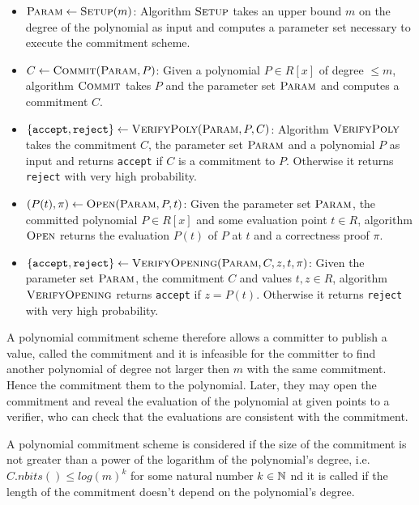 \begin{itemize}
\item $\textsc{Param}\leftarrow \textsc{Setup}(m)$: Algorithm $\textsc{Setup}$ takes an upper bound $m$ on the degree of the polynomial as input and computes a parameter set necessary to execute the commitment scheme.
\item $C\leftarrow \textsc{Commit}(\textsc{Param},P)$: Given a polynomial $P\in R[x]$ of degree $\leq m$, algorithm $\textsc{Commit}$ takes $P$ and the parameter set $\textsc{Param}$ and computes a commitment $C$.
\item $\{\mathtt{accept},\mathtt{reject}\}\leftarrow \textsc{VerifyPoly}(\textsc{Param},P,C)$: Algorithm $\textsc{VerifyPoly}$ takes the commitment $C$, the parameter set $\textsc{Param}$ and a polynomial $P$ as input and returns \texttt{accept} if $C$ is a commitment to $P$. Otherwise it returns \texttt{reject} with very high probability.
\item $(P(t),\pi)\leftarrow \textsc{Open}(\textsc{Param},P,t)$: Given the parameter set $\textsc{Param}$, the committed polynomial $P\in R[x]$ and some evaluation point $t\in R$, algorithm $\textsc{Open}$ returns the evaluation $P(t)$ of $P$ at $t$ and a correctness proof $\pi$.
\item $\{\mathtt{accept},\mathtt{reject}\}\leftarrow \textsc{VerifyOpening}(\textsc{Param},C,z,t,\pi)$: Given the parameter set $\textsc{Param}$, the commitment $C$ and values $t,z\in R$, algorithm $\textsc{VerifyOpening}$ returns \texttt{accept} if $z=P(t)$. Otherwise it returns \texttt{reject} with very high probability.
\end{itemize}

A polynomial commitment scheme therefore allows a committer to publish a value, called the commitment and it is infeasible for the committer to find another polynomial of degree not larger then $m$ with the same commitment. Hence the commitment  them to the polynomial. Later, they may open the commitment and reveal the evaluation of the polynomial at given points to a verifier, who can check that the evaluations are consistent with the commitment. 

A polynomial commitment scheme is considered  if the size of the commitment is not greater than a power of the logarithm of the polynomial's degree, i.e. $C.nbits() \leq log(m)^k$ for some natural number $k\in \mathbb{N}$ nd it is called  if the length of the commitment doesn't depend on the polynomial's degree.

